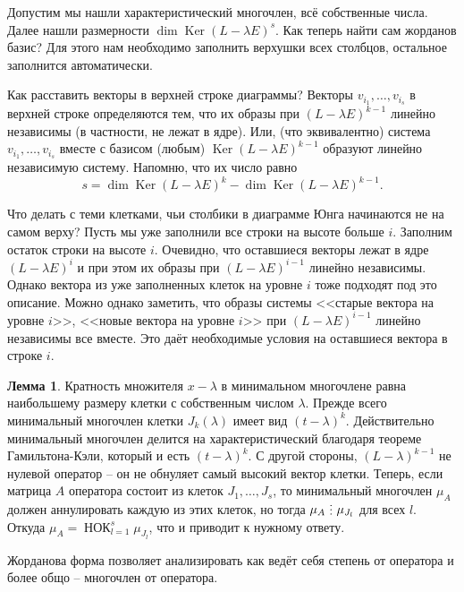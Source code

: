 \documentclass[10pt,a4paper,oneside]{book} %
\theoremstyle{definition}
\newtheorem{lem}{Лемма}
\DeclareMathOperator{\Ker}{Ker}
\newcommand{\di}{\mathop{\,\scalebox{0.85}{\raisebox{-1.2pt}[0.5\height]{\vdots}}\,}}
\newcommand{\Nok}{\operatorname{\text{НОК}}}
\def\lm{\begin{lem}}
\def\elm{\end{lem}}
\begin{document}
\endproof








Допустим мы нашли характеристический многочлен, всё собственные числа. Далее нашли размерности $\dim \Ker(L-\lambda E)^s$. Как теперь найти сам жорданов базис? Для этого нам необходимо заполнить верхушки всех столбцов, остальное заполнится автоматически.



Как расставить векторы в верхней строке диаграммы? Векторы $v_{i_1}, \dots, v_{i_s}$  в верхней строке определяются тем, что их образы при $(L-\lambda E)^{k-1}$ линейно независимы (в частности, не лежат в ядре). Или, (что эквивалентно) система $v_{i_1}, \dots, v_{i_s}$ вместе с базисом (любым) $\Ker (L-\lambda E)^{k-1}$ образуют линейно независимую систему. Напомню, что их число равно
$$s=\dim \Ker (L-\lambda E)^k - \dim \Ker (L-\lambda E)^{k-1}.$$



Что делать с теми клетками, чьи столбики в диаграмме Юнга начинаются не на самом верху? Пусть мы уже заполнили все строки на высоте больше $i$. Заполним остаток строки на высоте $i$.  Очевидно, что оставшиеся векторы лежат в ядре $(L-\lambda E)^{i}$ и при этом их образы при $(L-\lambda E)^{i-1}$ линейно независимы. Однако вектора из уже заполненных клеток на уровне $i$ тоже подходят под это описание. Можно однако заметить, что образы системы <<старые вектора на уровне $i$>>, <<новые вектора на уровне $i$>> при $(L-\lambda E)^{i-1}$ линейно независимы все вместе. Это даёт необходимые условия на оставшиеся вектора в строке $i$.


\lm
Кратность множителя $x-\lambda$ в минимальном многочлене равна наибольшему размеру клетки с собственным числом $\lambda$.
\proof Прежде всего минимальный многочлен клетки $J_k(\lambda)$ имеет вид $(t-\lambda)^k$. Действительно минимальный многочлен делится на характеристический благодаря теореме Гамильтона-Кэли, который и есть $(t-\lambda)^k$. С другой стороны, $(L-\lambda)^{k-1}$ не нулевой оператор -- он не обнуляет самый высокий вектор клетки.
Теперь, если матрица $A$ оператора состоит из клеток $J_1,\dots, J_s$, то минимальный многочлен $\mu_A$ должен аннулировать каждую из этих клеток, но тогда $\mu_A \di \mu_{J_l}$ для всех $l$. Откуда $\mu_A= \Nok_{l=1}^s \mu_{J_l}$, что и приводит к нужному ответу.
\endproof
\elm

Жорданова форма позволяет анализировать как ведёт себя степень от оператора и более общо -- многочлен от оператора.
\end{document}
